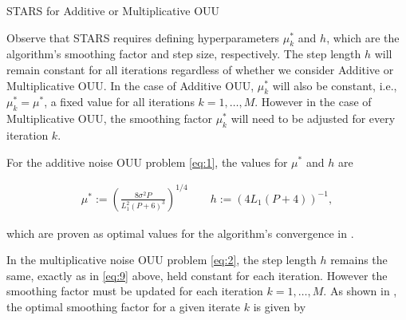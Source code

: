 \documentclass{amsart}
\begin{document}
\begin{algorithm}[H]

\SetAlgoLined

 


	\caption{STARS for Additive or Multiplicative OUU}

\end{algorithm}

\vspace{.25cm}

\noindent Observe that STARS requires defining hyperparameters $\mu^*_k$ and $h$, which are the algorithm's smoothing factor and step size, respectively. The step length $h$ will remain constant for all iterations regardless of whether we consider Additive or Multiplicative OUU. In the case of Additive OUU, $\mu^*_k$ will also be constant, i.e., $\mu^*_k=\mu^*$, a fixed value for all iterations $k=1, \ldots, M$. However in the case of Multiplicative OUU, the smoothing factor $\mu^*_k$ will need to be adjusted for every iteration $k$.  

For the additive noise OUU problem \eqref{eq:1}, the values for $\mu^*$ and $h$ are 

\begin{eqnarray} \label{eq:9}
\mu^*:=\left( \frac{8\sigma^2 P}{L_1^2(P+6)^3}\right)^{1/4} \quad \quad h:=(4L_1(P+4))^{-1},
\end{eqnarray} 

\noindent which are proven as optimal values for the algorithm's convergence in \cite{CW}. 

In the multiplicative noise OUU problem \eqref{eq:2}, the step length $h$ remains the same, exactly as in \eqref{eq:9} above, held constant for each iteration. However the smoothing factor must be updated for each iteration $k=1,\ldots, M.$ As shown in \cite{CW}, the optimal smoothing factor for a given iterate $k$ is given by
\end{document}
